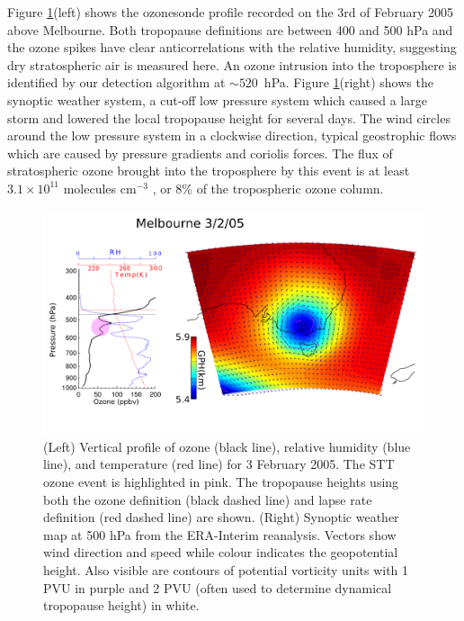 \documentclass{article}
\begin{document}
  Figure \ref{fig:Melbourne20050203}(left) shows the ozonesonde profile recorded on the 3rd of February 2005 above Melbourne.
  Both tropopause definitions are between 400 and 500 hPa and the ozone spikes have clear anticorrelations with the relative humidity, suggesting dry stratospheric air is measured here. 
  An ozone intrusion into the troposphere is identified by our detection algorithm at $\sim520$~hPa.
  Figure \ref{fig:Melbourne20050203}(right) shows the synoptic weather system, a cut-off low pressure system which caused a large storm and lowered the local tropopause height for several days.
  The wind circles around the low pressure system in a clockwise direction, typical geostrophic flows which are caused by pressure gradients and coriolis forces.
  The flux of stratospheric ozone brought into the troposphere by this event is at least $3.1 \times 10^{11}$ molecules cm$^{-3}$ , or 8\% of the tropospheric ozone column.

  \begin{figure}[!htbp]
    \begin{center}
    \includegraphics[width=1.0\columnwidth]{figures/Melbourne20050203.png}
    \caption{(Left) Vertical profile of ozone (black line), relative humidity (blue line), and temperature (red line) for  3 February 2005.
    The STT ozone event is highlighted in pink.
    The tropopause heights using both the ozone definition (black dashed line) and lapse rate definition (red dashed line) are shown.
    (Right) Synoptic weather map at 500 hPa from the ERA-Interim reanalysis.
    Vectors show wind direction and speed while colour indicates the geopotential height.
    Also visible are contours of potential vorticity units with 1 PVU in purple and 2 PVU (often used to determine dynamical tropopause height) in white.}
    \label{fig:Melbourne20050203}
    \end{center}
  \end{figure}
  
\end{document}

